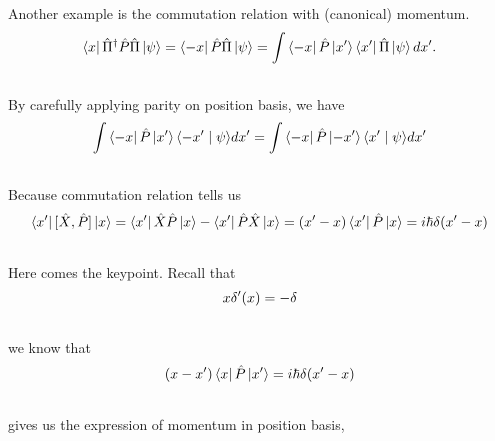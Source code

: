 \documentclass[letterpaper,10pt,english]{sphinxmanual}
\newcommand{\bra}[1]{\left\langle #1\right|}
\newcommand{\ket}[1]{\left| #1\right\rangle}
\newcommand{\braket}[2]{\langle #1 \mid #2 \rangle}
\begin{document}
\begin{enumerate}
Another example is the commutation relation with (canonical) momentum.
\begin{gather}
\begin{split}\bra{x}\hat \Pi^\dagger \hat P \hat \Pi \ket{\psi} = \bra{-x} \hat P \hat \Pi\ket{\psi} = \int \bra{-x}\hat P \ket{x'}\bra{x'}\hat \Pi\ket{\psi} dx'  .\end{split}\notag\\\begin{split}\end{split}\notag
\end{gather}
By carefully applying parity on position basis, we have
\begin{gather}
\begin{split}\int \bra{-x}\hat P \ket{x'}\braket{-x'}{\psi} d x' = \int \bra{-x}\hat P \ket{-x'}\braket{x'}{\psi} d x'\end{split}\notag\\\begin{split}\end{split}\notag
\end{gather}
Because commutation relation tells us
\begin{gather}
\begin{split}\bra{x'}[\hat X,\hat P]\ket{x} = \bra{x'}\hat X \hat P\ket{x} - \bra{x'}\hat P \hat X\ket{x} = (x' - x)\bra{x'}\hat P\ket{x} = i\hbar \delta(x'-x)\end{split}\notag\\\begin{split}\end{split}\notag
\end{gather}
Here comes the keypoint. Recall that
\begin{gather}
\begin{split}x\delta'(x) = -\delta\end{split}\notag\\\begin{split}\end{split}\notag
\end{gather}
we know that
\begin{gather}
\begin{split}(x - x')\bra{x}\hat P\ket{x'} = i\hbar \delta(x'-x)\end{split}\notag\\\begin{split}\end{split}\notag
\end{gather}
gives us the expression of momentum in position basis,
\begin{gather}

\end{gather}
\end{enumerate}
\end{document}
